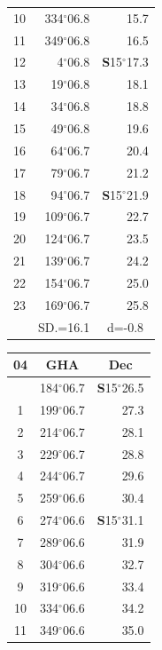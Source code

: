 \documentclass[10pt, a4paper]{report}
\begin{document}
\begin{scriptsize}
\begin{tabular*}{0.2\textwidth}[t]{@{\extracolsep{\fill}}|c|rr|}
10 & 334$^\circ$06.8 & 15.7\\
11 & 349$^\circ$06.8 & 16.5\\[2Pt]
12 & 4$^\circ$06.8 & \textbf{S}15$^\circ$17.3\\
13 & 19$^\circ$06.8 & 18.1\\
14 & 34$^\circ$06.8 & 18.8\\
15 & 49$^\circ$06.8 & \raisebox{0.24ex}{\boldmath$\cdot$~\boldmath$\cdot$~~}19.6\\
16 & 64$^\circ$06.7 & 20.4\\
17 & 79$^\circ$06.7 & 21.2\\[2Pt]
18 & 94$^\circ$06.7 & \textbf{S}15$^\circ$21.9\\
19 & 109$^\circ$06.7 & 22.7\\
20 & 124$^\circ$06.7 & 23.5\\
21 & 139$^\circ$06.7 & \raisebox{0.24ex}{\boldmath$\cdot$~\boldmath$\cdot$~~}24.2\\
22 & 154$^\circ$06.7 & 25.0\\
23 & 169$^\circ$06.7 & 25.8\\
\hline
\rule{0pt}{2.4ex} & \multicolumn{1}{c}{SD.=16.1} & \multicolumn{1}{c|}{d=-0.8}\\
\hline
\end{tabular*}\noindent
\begin{tabular*}{0.2\textwidth}[t]{@{\extracolsep{\fill}}|c|rr|}
\hline
\multicolumn{1}{|c|}{\rule{0pt}{2.6ex}\textbf{04}} & \multicolumn{1}{c}{\textbf{GHA}} & \multicolumn{1}{c|}{\textbf{Dec}}\\
\hline\rule{0pt}{2.6ex}\noindent
0 & 184$^\circ$06.7 & \textbf{S}15$^\circ$26.5\\
1 & 199$^\circ$06.7 & 27.3\\
2 & 214$^\circ$06.7 & 28.1\\
3 & 229$^\circ$06.7 & \raisebox{0.24ex}{\boldmath$\cdot$~\boldmath$\cdot$~~}28.8\\
4 & 244$^\circ$06.7 & 29.6\\
5 & 259$^\circ$06.6 & 30.4\\[2Pt]
6 & 274$^\circ$06.6 & \textbf{S}15$^\circ$31.1\\
7 & 289$^\circ$06.6 & 31.9\\
8 & 304$^\circ$06.6 & 32.7\\
9 & 319$^\circ$06.6 & \raisebox{0.24ex}{\boldmath$\cdot$~\boldmath$\cdot$~~}33.4\\
10 & 334$^\circ$06.6 & 34.2\\
11 & 349$^\circ$06.6 & 35.0\\[2Pt]

\end{tabular*}
\end{scriptsize}
\end{document}
